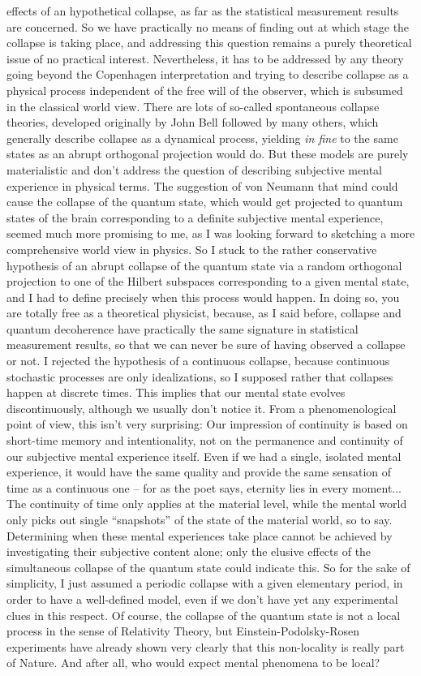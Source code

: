 effects of an hypothetical collapse, as far as the statistical measurement results are concerned. So we have practically no means of finding out at which stage the collapse is taking place, and addressing this question remains a purely theoretical issue of no practical interest. Nevertheless, it has to be addressed by any theory going beyond the Copenhagen interpretation and trying to describe collapse as a physical process independent of the free will of the observer, which is subsumed in the classical world view. There are lots of so-called spontaneous collapse theories, developed originally by John Bell followed by many others, which generally describe collapse as a dynamical process, yielding \textit{in fine} to the same states as an abrupt orthogonal projection would do. But these models are purely materialistic and don't address the question of describing subjective mental experience in physical terms. The suggestion of von Neumann that mind could cause the collapse of the quantum state, which would get projected to quantum states of the brain corresponding to a definite subjective mental experience, seemed much more promising to me, as I was looking forward to sketching a more comprehensive world view in physics. So I stuck to the rather conservative hypothesis of an abrupt collapse of the quantum state via a random orthogonal projection to one of the Hilbert subspaces corresponding to a given mental state, and I had to define precisely when this process would happen. In doing so, you are totally free as a theoretical physicist, because, as I said before, collapse and quantum decoherence have practically the same signature in statistical measurement results, so that we can never be sure of having observed a collapse or not. I rejected the hypothesis of a continuous collapse, because continuous stochastic processes are only idealizations, so I supposed rather that collapses happen at discrete times. This implies that our mental state evolves discontinuously, although we usually don't notice it. From a phenomenological point of view, this isn't very surprising: Our impression of continuity is based on short-time memory and intentionality, not on the permanence and continuity of our subjective mental experience itself. Even if we had a single, isolated mental experience, it would have the same quality and provide the same sensation of time as a continuous one -- for as the poet says, eternity lies in every moment... The continuity of time only applies at the material level, while the mental world only picks out single ``snapshots'' of the state of the material world, so to say. Determining when these mental experiences take place cannot be achieved by investigating their subjective content alone; only the elusive effects of the simultaneous collapse of the quantum state could indicate this. So for the sake of simplicity, I just assumed a periodic collapse with a given elementary period, in order to have a well-defined model, even if we don't have yet any experimental clues in this respect. Of course, the collapse of the quantum state is not a local process in the sense of Relativity Theory, but Einstein-Podolsky-Rosen experiments have already shown very clearly that this non-locality is really part of Nature. And after all, who would expect mental phenomena to be local? 